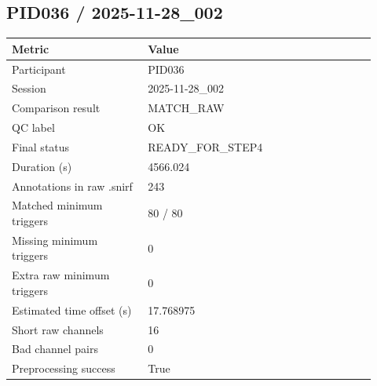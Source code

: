 \subsection*{PID036 / 2025-11-28\_002}
\begin{tabular}{p{0.34\linewidth}p{0.58\linewidth}}
\toprule
Metric & Value\\
\midrule
Participant & PID036\\
Session & 2025-11-28\_002\\
Comparison result & MATCH\_RAW\\
QC label & OK\\
Final status & READY\_FOR\_STEP4\\
Duration (s) & 4566.024\\
Annotations in raw .snirf & 243\\
Matched minimum triggers & 80 / 80\\
Missing minimum triggers & 0\\
Extra raw minimum triggers & 0\\
Estimated time offset (s) & 17.768975\\
Short raw channels & 16\\
Bad channel pairs & 0\\
Preprocessing success & True\\
\bottomrule
\end{tabular}
